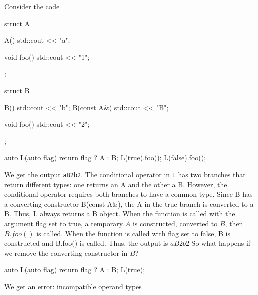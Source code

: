 \documentclass{report}
\begin{document}
\pagebreak 
{}
\bigbreak \noindent 
Consider the code
\bigbreak \noindent 
\begin{cppcode}
    struct A {
        A() { std::cout << "a"; }

        void foo() { std::cout << "1"; }
    };

    struct B {
        B() { std::cout << "b"; }
        B(const A&) { std::cout << "B"; }

        void foo() { std::cout << "2"; }
    };

    auto L(auto flag) {
        return flag ? A{} : B{};
    }
    L(true).foo();
    L(false).foo();
\end{cppcode}
\bigbreak \noindent 
We get the output \texttt{aB2b2}. The conditional operator in \texttt{L} has two branches that return different types: one returns an A and the other a B. However, the conditional operator requires both branches to have a common type. Since B has a converting constructor B(const A\&), the A{} in the true branch is converted to a B.
\bigbreak \noindent 
Thus, L always returns a B object. When the function is called with the argument flag set to true, a temporary $A$ is constructed, converted to $B$, then $B.foo()$ is called. When the function is called with flag set to false, B is constructed and B.foo() is called. Thus, the output is $aB2b2$
\bigbreak \noindent 
So what happens if we remove the converting constructor in $B$?
\bigbreak \noindent 
\begin{cppcode}
auto L(auto flag) {
    return flag ? A{} : B{};
}
L(true);
\end{cppcode}
\bigbreak \noindent 
We get an error: incompatible operand types
\end{document}

